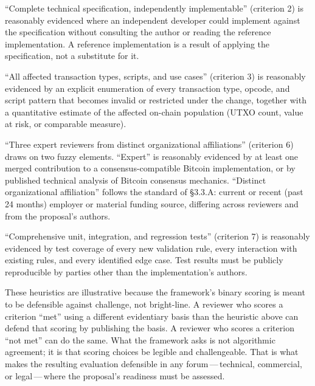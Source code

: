 \documentclass[11pt, twoside, openright]{book}
\newcommand{\sect}[1]{\S#1}
\begin{document}
``Complete technical specification, independently implementable'' (criterion 2) is reasonably evidenced where an independent developer could implement against the specification without consulting the author or reading the reference implementation. A reference implementation is a result of applying the specification, not a substitute for it.

``All affected transaction types, scripts, and use cases'' (criterion 3) is reasonably evidenced by an explicit enumeration of every transaction type, opcode, and script pattern that becomes invalid or restricted under the change, together with a quantitative estimate of the affected on-chain population (UTXO count, value at risk, or comparable measure).

``Three expert reviewers from distinct organizational affiliations'' (criterion 6) draws on two fuzzy elements. ``Expert'' is reasonably evidenced by at least one merged contribution to a consensus-compatible Bitcoin implementation, or by published technical analysis of Bitcoin consensus mechanics. ``Distinct organizational affiliation'' follows the standard of \sect{3.3}.A: current or recent (past 24 months) employer or material funding source, differing across reviewers and from the proposal's authors.

``Comprehensive unit, integration, and regression tests'' (criterion 7) is reasonably evidenced by test coverage of every new validation rule, every interaction with existing rules, and every identified edge case. Test results must be publicly reproducible by parties other than the implementation's authors.

These heuristics are illustrative because the framework's binary scoring is meant to be defensible against challenge, not bright-line. A reviewer who scores a criterion ``met'' using a different evidentiary basis than the heuristic above can defend that scoring by publishing the basis. A reviewer who scores a criterion ``not met'' can do the same. What the framework asks is not algorithmic agreement; it is that scoring choices be legible and challengeable. That is what makes the resulting evaluation defensible in any forum\,---\,technical, commercial, or legal\,---\,where the proposal's readiness must be assessed.
\end{document}
